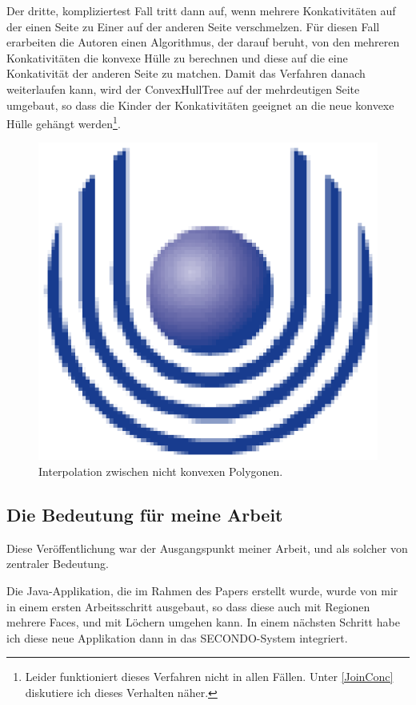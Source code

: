 Der dritte, kompliziertest Fall tritt dann auf, wenn mehrere Konkativitäten auf der einen Seite zu Einer auf der anderen Seite verschmelzen. Für diesen Fall erarbeiten die Autoren einen Algorithmus, der darauf beruht, von den mehreren Konkativitäten die konvexe Hülle zu berechnen und diese auf die eine Konkativität der anderen Seite zu matchen. Damit das Verfahren danach weiterlaufen kann, wird der ConvexHullTree auf der mehrdeutigen Seite umgebaut, so dass die Kinder der Konkativitäten geeignet an die neue konvexe Hülle gehängt werden\footnote{Leider funktioniert dieses Verfahren nicht in allen Fällen. Unter \ref{JoinConc} diskutiere ich dieses Verhalten näher.}.

\begin{figure}
	\centering
	\includegraphics{feu_logo2.eps}
	\caption{Interpolation zwischen nicht konvexen Polygonen.}
	\label{fig:Interpolationnonconvex}
\end{figure}

\subsection{Die Bedeutung für meine Arbeit}

Diese Veröffentlichung war der Ausgangspunkt meiner Arbeit, und als solcher von zentraler Bedeutung.

Die Java-Applikation, die im Rahmen des Papers erstellt wurde, wurde von mir in einem ersten Arbeitsschritt ausgebaut, so dass diese auch mit Regionen mehrere Faces, und mit Löchern umgehen kann. In einem nächsten Schritt habe ich diese neue Applikation dann in das SECONDO-System integriert.


